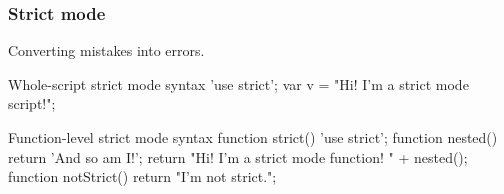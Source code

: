 \documentclass[aspectratio=1610]{beamer}
\begin{document}
\begin{frame}[fragile]
  \frametitle{Strict mode}
Converting mistakes into errors.

\begin{CodeBox}{Whole-script strict mode syntax}
'use strict';
var v = "Hi! I'm a strict mode script!";
\end{CodeBox}

\begin{CodeBox}{Function-level strict mode syntax}
function strict() {
  'use strict';
  function nested() { return 'And so am I!'; }
  return "Hi!  I'm a strict mode function!  " + nested();
}
function notStrict() { return "I'm not strict."; }
\end{CodeBox}


\end{frame}


\end{document}
